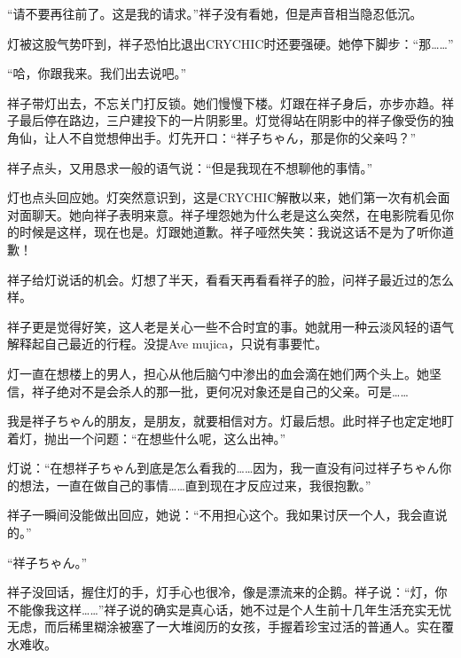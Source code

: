 \documentclass{article}
\begin{document}
“请不要再往前了。这是我的请求。”祥子没有看她，但是声音相当隐忍低沉。



灯被这股气势吓到，祥子恐怕比退出CRYCHIC时还要强硬。她停下脚步：“那……”



“哈，你跟我来。我们出去说吧。”



祥子带灯出去，不忘关门打反锁。她们慢慢下楼。灯跟在祥子身后，亦步亦趋。祥子最后停在路边，三户建投下的一片阴影里。灯觉得站在阴影中的祥子像受伤的独角仙，让人不自觉想伸出手。灯先开口：“祥子ちゃん，那是你的父亲吗？”



祥子点头，又用恳求一般的语气说：“但是我现在不想聊他的事情。”



灯也点头回应她。灯突然意识到，这是CRYCHIC解散以来，她们第一次有机会面对面聊天。她向祥子表明来意。祥子埋怨她为什么老是这么突然，在电影院看见你的时候是这样，现在也是。灯跟她道歉。祥子哑然失笑：我说这话不是为了听你道歉！



祥子给灯说话的机会。灯想了半天，看看天再看看祥子的脸，问祥子最近过的怎么样。



祥子更是觉得好笑，这人老是关心一些不合时宜的事。她就用一种云淡风轻的语气解释起自己最近的行程。没提Ave mujica，只说有事要忙。



灯一直在想楼上的男人，担心从他后脑勺中渗出的血会滴在她们两个头上。她坚信，祥子绝对不是会杀人的那一批，更何况对象还是自己的父亲。可是……



我是祥子ちゃん的朋友，是朋友，就要相信对方。灯最后想。此时祥子也定定地盯着灯，抛出一个问题：“在想些什么呢，这么出神。”



灯说：“在想祥子ちゃん到底是怎么看我的……因为，我一直没有问过祥子ちゃん你的想法，一直在做自己的事情……直到现在才反应过来，我很抱歉。”



祥子一瞬间没能做出回应，她说：“不用担心这个。我如果讨厌一个人，我会直说的。”



“祥子ちゃん。”



祥子没回话，握住灯的手，灯手心也很冷，像是漂流来的企鹅。祥子说：“灯，你不能像我这样……”祥子说的确实是真心话，她不过是个人生前十几年生活充实无忧无虑，而后稀里糊涂被塞了一大堆阅历的女孩，手握着珍宝过活的普通人。实在覆水难收。
\end{document}
